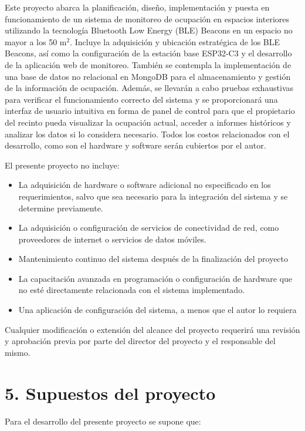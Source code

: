 \documentclass[
11pt, %
]{charter}
\begin{document}
\setlength{\parindent}{1cm}Este proyecto abarca la planificación, diseño, implementación y puesta en funcionamiento de un sistema de monitoreo de ocupación en espacios interiores utilizando la tecnología Bluetooth Low Energy (BLE) Beacons en un espacio no mayor a los 50 m$^2$. Incluye la adquisición y ubicación estratégica de los BLE Beacons, así como la configuración de la estación base ESP32-C3 y el desarrollo de la aplicación web de monitoreo. También se contempla la implementación de una base de datos no relacional en MongoDB para el almacenamiento y gestión de la información de ocupación. Además, se llevarán a cabo pruebas exhaustivas para verificar el funcionamiento correcto del sistema y se proporcionará una interfaz de usuario intuitiva en forma de panel de control para que el propietario del recinto pueda visualizar la ocupación actual, acceder a informes históricos y analizar los datos si lo considera necesario. Todos los costos relacionados con el desarrollo, como son el hardware y software serán cubiertos por el autor.

El presente proyecto no incluye:
\begin{itemize}
	\item La adquisición de hardware o software adicional no especificado en los requerimientos, salvo que sea necesario para la integración del sistema y se determine previamente.
	\item La adquisición o configuración de servicios de conectividad de red, como proveedores de internet o servicios de datos móviles.
	\item Mantenimiento continuo del sistema después de la finalización del proyecto
	\item La capacitación avanzada en programación o configuración de hardware que no esté directamente relacionada con el sistema implementado.
	\item Una aplicación de configuración del sistema, a menos que el autor lo requiera
\end{itemize}

\setlength{\parindent}{1cm}Cualquier modificación o extensión del alcance del proyecto requerirá una revisión y aprobación previa por parte del director del proyecto y el responsable del mismo.


\section{5. Supuestos del proyecto}
\label{sec:supuestos}

Para el desarrollo del presente proyecto se supone que:
\end{document}
